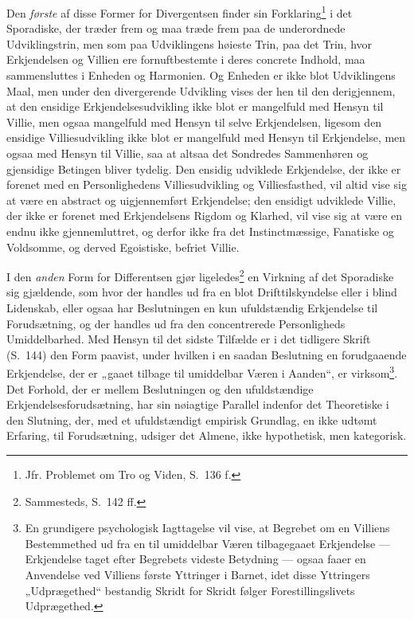 Den \emph{første} af disse Former for Divergentsen finder sin
Forklaring\footnote{Jfr. Problemet om Tro og Viden, S.\ 136 f.} i det
Sporadiske, der træder frem og maa træde frem paa de underordnede
Udviklingstrin, men som paa Udviklingens høieste Trin, paa det Trin, hvor
Erkjendelsen og Villien ere fornuftbestemte i deres concrete Indhold, maa
sammensluttes i Enheden og Harmonien. Og Enheden er ikke blot Udviklingens
Maal, men under den divergerende Udvikling vises der hen til den derigjennem,
at den ensidige Erkjendelsesudvikling ikke blot er mangelfuld med Hensyn til
Villie, men ogsaa mangelfuld med Hensyn til selve Erkjendelsen, ligesom den
ensidige Villiesudvikling ikke blot er mangelfuld med Hensyn til Erkjendelse,
men ogsaa med Hensyn til Villie, saa at altsaa det Sondredes Sammenhøren og
gjensidige Betingen bliver tydelig. Den ensidig udviklede Erkjendelse, der
ikke er forenet med en Personlighedens Villiesudvikling og Villiesfasthed, vil
altid vise sig at være en abstract og uigjennemført Erkjendelse; den ensidigt
udviklede Villie, der ikke er forenet med Erkjendelsens Rigdom og Klarhed, vil
vise sig at være en endnu ikke gjennemluttret, og derfor ikke fra det
Instinctmæssige, Fanatiske og Voldsomme, og derved Egoistiske, befriet Villie.

I den \emph{anden} Form for Differentsen gjør ligeledes\footnote{Sammesteds,
S.\ 142 ff.} en Virkning af det Sporadiske sig gjældende, som hvor der handles
ud fra en blot Drifttilskyndelse eller i blind Lidenskab, eller ogsaa har
Beslutningen en kun ufuldstændig Erkjendelse til Forudsætning, og der handles
ud fra den concentrerede Personligheds Umiddelbarhed. Med Hensyn til det
sidste Tilfælde er i det tidligere Skrift (S.\ 144) den Form
 \setcounter{footnote}{0}%
paavist, under hvilken i en saadan Beslutning en forudgaaende Erkjendelse, der
er „gaaet tilbage til umiddelbar Væren i Aanden“, er virksom\footnote{En
grundigere psychologisk Iagttagelse vil vise, at Begrebet om en Villiens
Bestemmethed ud fra en til umiddelbar Væren tilbagegaaet Erkjendelse ---
Erkjendelse taget efter Begrebets videste Betydning --- ogsaa faaer en
Anvendelse ved Villiens første Yttringer i Barnet, idet disse Yttringers
„Udprægethed“ bestandig Skridt for Skridt følger Forestillingslivets
Udprægethed.}. Det Forhold, der er mellem Beslutningen og den ufuldstændige
Erkjendelsesforudsætning, har sin nøiagtige Parallel indenfor det Theoretiske
i den Slutning, der, med et ufuldstændigt empirisk Grundlag, en ikke udtømt
Erfaring, til Forudsætning, udsiger det Almene, ikke hypothetisk, men
kategorisk.

